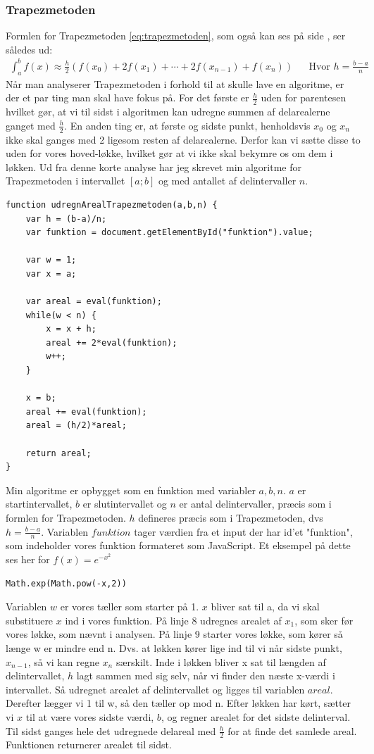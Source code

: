 \documentclass[12pt]{article}
\numberwithin{equation}{section}
\begin{document}
\subsubsection{Trapezmetoden}
Formlen for Trapezmetoden \eqref{eq:trapezmetoden}, som også kan ses på side \pageref{eq:trapezmetoden}, ser således ud:
\begin{align}
\int_{a}^{b}f(x) \approx \frac{h}{2}(f(x_0) + 2f(x_1) + \cdots + 2f(x_{n-1}) + f(x_n)) &&\text{Hvor } h=\frac{b-a}{n} \nonumber
\end{align}
Når man analyserer Trapezmetoden i forhold til at skulle lave en algoritme, er der et par ting man skal have fokus på. For det første er $\frac{h}{2}$ uden for parentesen hvilket gør, at vi til sidst i algoritmen kan udregne summen af delarealerne ganget med $\frac{h}{2}$. En anden ting er, at første og sidste punkt, henholdsvis $x_0$ og $x_n$ ikke skal ganges med 2 ligesom resten af delarealerne. Derfor kan vi sætte disse to uden for vores hoved-løkke, hvilket gør at vi ikke skal bekymre os om dem i løkken.
Ud fra denne korte analyse har jeg skrevet min algoritme for Trapezmetoden i intervallet $[a;b]$ og med antallet af delintervaller $n$.
\begin{lstlisting}[caption="udregnArealTrapezmetoden()"]
function udregnArealTrapezmetoden(a,b,n) {
	var h = (b-a)/n;
	var funktion = document.getElementById("funktion").value;
	
	var w = 1;
	var x = a;
	
	var areal = eval(funktion);
	while(w < n) {
		x = x + h;
		areal += 2*eval(funktion);
		w++;
	}
		
	x = b;
	areal += eval(funktion);
	areal = (h/2)*areal;
		
	return areal;
}
\end{lstlisting}

Min algoritme er opbygget som en funktion med variabler $a,b,n$. $a$ er startintervallet, $b$ er slutintervallet og $n$ er antal delintervaller, præcis som i formlen for Trapezmetoden. $h$ defineres præcis som i Trapezmetoden, dvs $h=\frac{b-a}{n}$. Variablen $funktion$ tager værdien fra et input der har id'et "funktion", som indeholder vores funktion formateret som JavaScript. Et eksempel på dette ses her for $f(x) = e^{-x^2}$
\begin{lstlisting}
Math.exp(Math.pow(-x,2))
\end{lstlisting}
Variablen $w$ er vores tæller som starter på 1. $x$ bliver sat til a, da vi skal substituere $x$ ind i vores funktion. På linje 8 udregnes arealet af $x_1$, som sker før vores løkke, som nævnt i analysen. På linje 9 starter vores løkke, som kører så længe w er mindre end n. Dvs. at løkken kører lige ind til vi når sidste punkt, $x_{n-1}$, så vi kan regne $x_n$ særskilt. Inde i løkken bliver x sat til længden af delintervallet, $h$ lagt sammen med sig selv, når vi finder den næste x-værdi i intervallet. Så udregnet arealet af delintervallet og ligges til variablen $areal$. Derefter lægger vi 1 til w, så den tæller op mod n.
Efter løkken har kørt, sætter vi $x$ til at være vores sidste værdi, $b$, og regner arealet for det sidste delinterval. Til sidst ganges hele det udregnede delareal med $\frac{h}{2}$ for at finde det samlede areal. Funktionen returnerer arealet til sidst.
\end{document}
